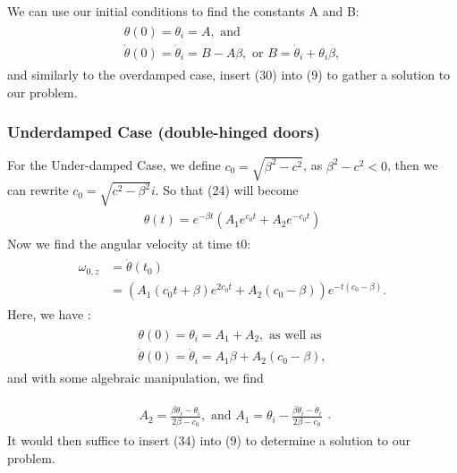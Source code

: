     We can use our initial conditions to find the constants A and B:
    \begin{eqnarray}
    \begin{split}
        \theta(0)=\theta_{i}=A, \text{ and }\\
        \dot\theta(0)=\dot\theta_{i}=B-A\beta, \text{ or } B=\dot\theta_{i}+\theta_{i}\beta,
    \end{split}
    \end{eqnarray}
    and similarly to the overdamped case, insert (30) into (9) to gather a solution to our problem. 
    \subsubsection{Underdamped Case (double-hinged doors)}
	For the Under-damped Case, we define $c_{0}=\sqrt{\beta^{2}-c^{2}}$, as $\beta^{2}-c^{2}<0$, then we can rewrite $c_{0}=\sqrt{c^2-\beta^{2}}i$. So that (24) will become
    \begin{eqnarray}
    \begin{split}
      \theta(t)=e^{-\beta t}(A_{1}e^{c_{0}t}+A_{2}e^{-c_{0}t})
    \end{split}
    \end{eqnarray}
    Now we find the angular velocity at time t0:\begin{eqnarray}
    \begin{split}
        \omega_{0,z} & =\dot\theta(t_{0})\\
        & =(A_{1}(c_{0}t+\beta)e^{2c_{0}t}+A_{2}(c_{0}-\beta))e^{-t(c_{0}-\beta)}.
    \end{split}
    \end{eqnarray}
    Here, we have :
      \begin{eqnarray}
    \begin{split}
        \theta(0)=\theta_{i}=A_{1}+A_{2}, \text{ as well as }\\ \dot\theta(0)=\dot\theta_{i}=A_{1}\beta+A_{2}(c_{0}-\beta),
    \end{split}
    \end{eqnarray}  and with some algebraic manipulation, we find
    
    \begin{eqnarray}
    \begin{split}
        A_{2}=\frac{\beta\theta_{i}-\dot\theta_{i}}{2\beta-c_{0}}, \text{ and }
        A_{1}=\theta_{i}-\frac{\beta\theta_{i}-\dot\theta_{i}}{2\beta-c_{0}}
    \end{split}.
    \end{eqnarray}
      It would then suffice to insert (34) into (9) to determine a solution to our problem.\par

    
